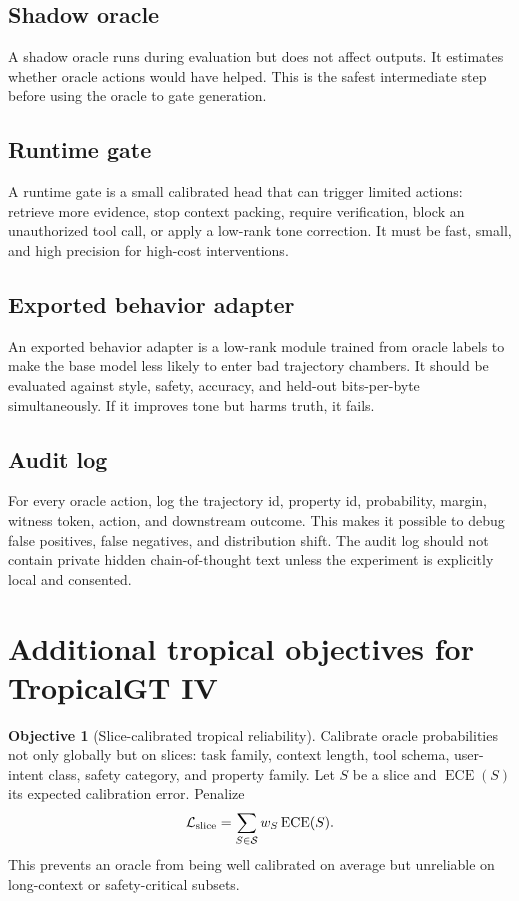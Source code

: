 \documentclass[11pt]{article}
\theoremstyle{definition}
\newtheorem{objective}[theorem]{Objective}
\theoremstyle{remark}
\newcommand{\loss}{\mathcal{L}}
\numberwithin{equation}{section}
\begin{document}
\subsection{Shadow oracle}
A shadow oracle runs during evaluation but does not affect outputs.  It estimates whether oracle actions would have helped.  This is the safest intermediate step before using the oracle to gate generation.

\subsection{Runtime gate}
A runtime gate is a small calibrated head that can trigger limited actions: retrieve more evidence, stop context packing, require verification, block an unauthorized tool call, or apply a low-rank tone correction.  It must be fast, small, and high precision for high-cost interventions.

\subsection{Exported behavior adapter}
An exported behavior adapter is a low-rank module trained from oracle labels to make the base model less likely to enter bad trajectory chambers.  It should be evaluated against style, safety, accuracy, and held-out bits-per-byte simultaneously.  If it improves tone but harms truth, it fails.

\subsection{Audit log}
For every oracle action, log the trajectory id, property id, probability, margin, witness token, action, and downstream outcome.  This makes it possible to debug false positives, false negatives, and distribution shift.  The audit log should not contain private hidden chain-of-thought text unless the experiment is explicitly local and consented.

\section{Additional tropical objectives for TropicalGT IV}

\begin{objective}[Slice-calibrated tropical reliability]
Calibrate oracle probabilities not only globally but on slices: task family, context length, tool schema, user-intent class, safety category, and property family.  Let \(S\) be a slice and \(\operatorname{ECE}(S)\) its expected calibration error.  Penalize
\begin{equation}
    \loss_{\rm slice}=\sum_{S\in\mathcal S}w_S\operatorname{ECE}(S).
\end{equation}
This prevents an oracle from being well calibrated on average but unreliable on long-context or safety-critical subsets.
\end{objective}
\end{document}
